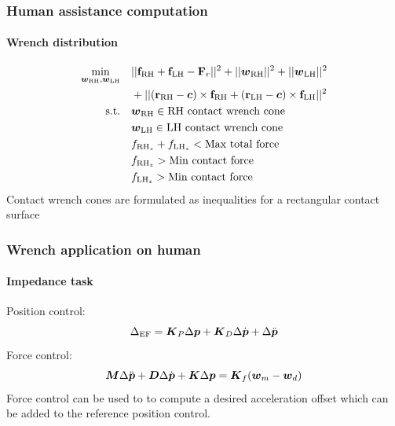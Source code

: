 \documentclass[10pt]{beamer}
\begin{document}
\begin{frame}
  \frametitle{Human assistance computation}
  \framesubtitle{Wrench distribution}
  \begin{equation}
    \begin{aligned}
      \min_{{\boldsymbol{w}}_\text{RH}, {\boldsymbol{w}}_\text{LH}} \quad & ||{\bf f}_\text{RH} + {\bf
      f}_\text{LH} - \mathbf{F}_{r}||^2 + ||{\boldsymbol{w}}_\text{RH}||^2 + ||{\boldsymbol{w}}_\text{LH}||^2 \\
      &+ ||({\bf r}_{\text{RH}} - \CoM) \times {\bf f}_{\text{RH}} + ({\bf r}_\text{LH} - \CoM) \times {\bf
      f}_\text{LH} ||^2\\  %
      \textrm{s.t.} \quad & {\boldsymbol{w}}_\text{RH}  \in \textrm{RH contact wrench cone} \\
      & {\boldsymbol{w}}_\text{LH}  \in \textrm{LH contact wrench cone} \\
      & f_{\text{RH}_z} + f_{\text{LH}_z} < \textrm{Max total force}  \\
      & f_{\text{RH}_z} > \textrm{Min contact force}    \\
      & f_{\text{LH}_z} > \textrm{Min contact force}    \\
    \end{aligned}
  \end{equation}
  Contact wrench cones are formulated as inequalities for a rectangular contact surface
\end{frame}

\begin{frame}
  \frametitle{Wrench application on human}
  \framesubtitle{Impedance task}
  Position control:
  \begin{equation}
    \label{Eq:EndEff task}
    \Delta_\text{EF} = \boldsymbol{K}_P\Delta\boldsymbol{p} + \boldsymbol{K}_D\Delta\dot{\boldsymbol{p}} +
    \Delta\ddot{\boldsymbol{p}}
  \end{equation}
  Force control:
  \begin{equation}
    \label{Eq:Impedance}
    \boldsymbol{M}\Delta\ddot{\boldsymbol{p}} + \boldsymbol{D}\Delta\dot{\boldsymbol{p}} +
    \boldsymbol{K}\Delta\boldsymbol{p} = \boldsymbol{K}_f (\boldsymbol{w}_m - \boldsymbol{w}_d)
  \end{equation}
  \vfill
  Force control can be used to to compute a desired acceleration offset which can be added to the reference
  position control.
\end{frame}
\end{document}

